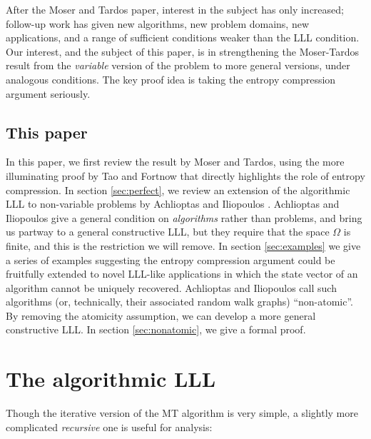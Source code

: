 \documentclass[twocolumn]{article}
\begin{document}
After the Moser and Tardos paper, interest in the subject has only increased; follow-up work has given new algorithms, new problem domains, new applications, and a range of sufficient conditions weaker than the LLL condition.  Our interest, and the subject of this paper, is in strengthening the Moser-Tardos result from the \emph{variable} version of the problem to more general versions, under analogous conditions.  The key proof idea is taking the entropy compression argument seriously. %

\subsection{This paper}
In this paper, we first review the result by Moser and Tardos, using the more illuminating proof by Tao \cite{tao2009entropy} and Fortnow \cite{fortnow2009entropy} that directly highlights the role of entropy compression.  In section \ref{sec:perfect}, we review an extension of the algorithmic LLL to non-variable problems by Achlioptas and Iliopoulos \cite{achlioptas2014random}.  Achlioptas and Iliopoulos give a general condition on \emph{algorithms} rather than problems, and bring us partway to a general constructive LLL, but they require that the space $\Omega$ is finite, and this is the restriction we will remove.  In section \ref{sec:examples} we give a series of examples suggesting the entropy compression argument could be fruitfully extended to novel LLL-like applications in which the state vector of an algorithm cannot be uniquely recovered.  Achlioptas and Iliopoulos call such algorithms (or, technically, their associated random walk graphs) ``non-atomic''.  By removing the atomicity assumption, we can develop a more general constructive LLL.  In section \ref{sec:nonatomic}, we give a formal proof.  %

\section{The algorithmic LLL}
\label{sec:lll}
Though the iterative version of the MT algorithm is very simple, a slightly more complicated \emph{recursive} one is useful for analysis:
\end{document}
